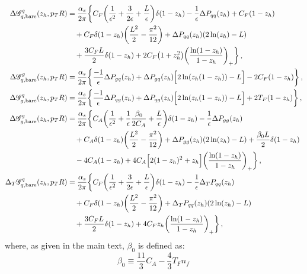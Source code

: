 \documentclass[a4paper, 11 pt]{article}
\newcommand{\nnu}{\nonumber\\}
\begin{document}
\begin{align}
\Delta \mathscr{G}_{q, \text{bare}}^q (z_h, p_T R)
& =
\frac{\alpha _s}{2 \pi} \bigg\{C_F \pqty{\frac{1}{\epsilon ^2} + \frac{3}{2 \epsilon} + \frac{L}{\epsilon}} \delta (1-z_h) - \frac{1}{\epsilon} \Delta P_{qq} (z_h) + C_F (1-z_h)
\nonumber \\
& \quad + C_F \delta (1-z_h) \pqty{\frac{L^2}{2}-\frac{\pi ^2}{12}} + \Delta P_{qq} (z_h) (2 \ln(z_h) - L) \nnu
& \quad + \frac{3 C_F L}{2} \delta \pqty{1-z_h} + 2 C_F \pqty{1+z_h^2} \pqty{\frac{\ln (1-z_h)}{1-z_h}}_+ \bigg\}
\, , \label{e.bare_exclusive_FJFs_qq} \\
\Delta \mathscr{G}_{q, \text{bare}}^g (z_h, p_T R)
& =
\frac{\alpha _s}{2 \pi} \bigg\{\frac{-1}{\epsilon} \Delta P_{gq}(z_h) + \Delta P_{gq}(z_h) \Big[2 \ln(z_h (1-z_h)) - L\Big] - 2 C_F (1-z_h) \bigg\}
\, , \label{e.bare_exclusive_FJFs_qg} \\
\Delta \mathscr{G}_{g, \text{bare}}^q (z_h, p_T R)
& =
\frac{\alpha _s}{2 \pi} \bigg\{\frac{-1}{\epsilon} \Delta P_{qg}(z_h)+\Delta P_{qg}(z_h) \Big[2\ln(z_h (1-z_h)) - L \Big] + 2 T_F (1-z_h) \bigg\}
\, , \label{e.bare_exclusive_FJFs_gq} \\
\Delta \mathscr{G}_{g, \text{bare}}^g (z_h, p_T R)
& =
\frac{\alpha _s}{2 \pi} \bigg\{C_A \pqty{\frac{1}{\epsilon ^2}+\frac{1}{\epsilon} \frac{\beta _0}{2 C_A}+\frac{L}{\epsilon}} \delta(1-z_h) - \frac{1}{\epsilon} \Delta P_{gg}(z_h)
\nonumber \\
& \quad + C_A \delta (1-z_h) \pqty{\frac{L^2}{2}-\frac{\pi^2}{12}} + \Delta P_{gg}(z_h)(2\ln(z_h) - L) + \frac{\beta _0 L}{2} \delta (1-z_h)
\nonumber \\
& \quad - 4 C_A (1-z_h) + 4 C_A \Big[2(1-z_h)^2+z_h\Big] \pqty{\frac{\ln(1-z_h)}{1-z_h}}_+ \bigg\}
\, , \label{e.bare_exclusive_FJFs_gg} \\
\Delta _T \mathscr{G}_{q, \text{bare}}^q (z_h, p_T R)
& =
\frac{\alpha _s}{2 \pi} \bigg\{C_F \pqty{\frac{1}{\epsilon ^2}+\frac{3}{2 \epsilon }+\frac{L}{\epsilon}} \delta (1-z_h) - \frac{1}{\epsilon} \Delta _T P_{qq}(z_h) \nonumber \\
& \quad + C_F \delta (1-z_h) \pqty{\frac{L^2}{2}-\frac{\pi ^2}{12}} + \Delta _T P_{qq}(z_h)(2\ln(z_h) - L) \nonumber \\
& \quad + \frac{3 C_F L}{2} \delta \pqty{1-z_h} + 4 C_F z_h \pqty{\frac{\ln (1-z_h)}{1-z_h}}_+ \bigg\}
\, , \label{e.bare_exclusive_FJFs_qq_T}
\end{align}
\endgroup
where, as given in the main text, $\beta_0$ is defined as:
\begin{equation}
\beta _0 \equiv \frac{11}{3} C_A - \frac{4}{3} T_F n_f\,
\end{equation}
\end{document}
